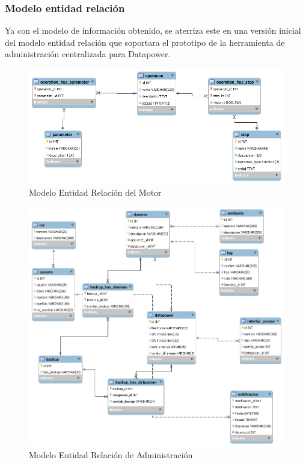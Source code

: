 \subsubsection{Modelo entidad relación}
Ya con el modelo de información obtenido, se aterriza este en una versión inicial del modelo entidad relación que soportara el prototipo de la herramienta de administración centralizada para Datapower.
\begin{figure}[th!]
    \centering
    \includegraphics[width=1.0\textwidth]{DesarrolloInvestigacion/images/ModeloEntidadRelacion2.png}
    \caption{Modelo Entidad Relación del Motor}
\end{figure}
\begin{figure}[th!]
    \centering
    \includegraphics[width=1.0\textwidth]{DesarrolloInvestigacion/images/ModeloEntidadRelacion1.png}
    \caption{Modelo Entidad Relación de Administración}
\end{figure}
